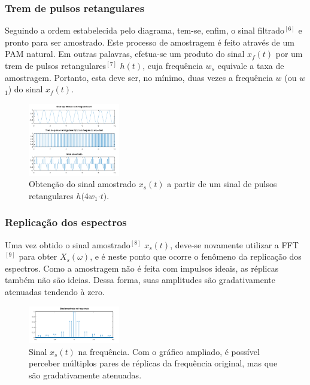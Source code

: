 \documentclass[]{IEEEtran}
\begin{document}
\subsubsection{Trem de pulsos retangulares}

Seguindo a ordem estabelecida pelo diagrama, tem-se, enfim, o sinal filtrado$^{[6]}$ e pronto para ser amostrado. Este processo de amostragem é feito através de um PAM natural. Em outras palavras, efetua-se um produto do sinal $x$$_f$$(t)$ por um trem de pulsos retangulares$^{[7]}$ $h(t)$, cuja frequência $w$$_s$ equivale a taxa de amostragem. Portanto, esta deve ser, no mínimo, duas vezes a frequência $w$ (ou $w$$_1$) do sinal $x$$_f$$(t)$.

\begin{figure}[H]
\captionsetup{justification=centering}
\centering %
\includegraphics[width=4cm]{ex_amostrando.png} %
\caption{Obtenção do sinal amostrado $x$$_s$$(t)$ a partir de um sinal de pulsos retangulares $h(4w$$_1$$\cdot t)$.}
\end{figure}

\subsubsection{Replicação dos espectros}

Uma vez obtido o sinal amostrado$^{[8]}$ $x$$_s$$(t)$, deve-se novamente utilizar a FFT$^{[9]}$ para obter $X$$_s$$(\omega)$, e é neste ponto que ocorre o fenômeno da replicação dos espectros. Como a amostragem não é feita com impulsos ideais, as réplicas também não são ideias. Dessa forma, suas amplitudes são gradativamente atenuadas tendendo à zero.

\begin{figure}[H]
\captionsetup{justification=centering}
\centering %
\includegraphics[width=4cm]{ex_replicacao.png} %
\caption{Sinal $x$$_s$$(t)$ na frequência. Com o gráfico ampliado, é possível perceber múltiplos pares de réplicas da frequência original, mas que são gradativamente atenuadas.}
\end{figure}
\end{document}
